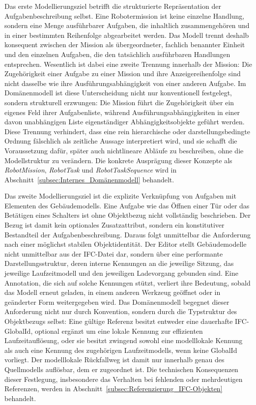 Das erste Modellierungsziel betrifft die strukturierte Repräsentation der Aufgabenbeschreibung
selbst. Eine Robotermission ist keine einzelne Handlung, sondern eine Menge ausführbarer Aufgaben,
die inhaltlich zusammengehören und in einer bestimmten Reihenfolge abgearbeitet werden. Das Modell
trennt deshalb konsequent zwischen der Mission als übergeordneter, fachlich benannter Einheit und
den einzelnen Aufgaben, die den tatsächlich ausführbaren Handlungen entsprechen. Wesentlich ist
dabei eine zweite Trennung innerhalb der Mission: Die Zugehörigkeit einer Aufgabe zu einer Mission
und ihre Anzeigereihenfolge sind nicht dasselbe wie ihre Ausführungsabhängigkeit von einer anderen
Aufgabe. Im Domänenmodell ist diese Unterscheidung nicht nur konventionell festgelegt, sondern
strukturell erzwungen: Die Mission führt die Zugehörigkeit über ein eigenes Feld ihrer
Aufgabenliste, während Ausführungsabhängigkeiten in einer davon unabhängigen Liste eigenständiger
Abhängigkeitsobjekte geführt werden. Diese Trennung verhindert, dass eine rein hierarchische oder
darstellungsbedingte Ordnung fälschlich als zeitliche Aussage interpretiert wird, und sie schafft
die Voraussetzung dafür, später auch nichtlineare Abläufe zu beschreiben, ohne die Modellstruktur zu
verändern. Die konkrete Ausprägung dieser Konzepte als \textit{RobotMission}, \textit{RobotTask}
und \textit{RobotTaskSequence} wird in Abschnitt~\ref{subsec:Internes_Domänenmodell} behandelt.

Das zweite Modellierungsziel ist die explizite Verknüpfung von Aufgaben mit Elementen des
Gebäudemodells. Eine Aufgabe wie das Öffnen einer Tür oder das Betätigen eines Schalters ist ohne
Objektbezug nicht vollständig beschrieben. Der Bezug ist damit kein optionales Zusatzattribut, sondern ein
konstitutiver Bestandteil der Aufgabenbeschreibung. Daraus folgt unmittelbar die Anforderung nach
einer möglichst stabilen Objektidentität. Der Editor stellt Gebäudemodelle nicht unmittelbar aus der
IFC-Datei dar, sondern über eine performante Darstellungsstruktur, deren interne Kennungen an die
jeweilige Sitzung, das jeweilige Laufzeitmodell und den jeweiligen Ladevorgang gebunden sind. Eine
Annotation, die sich auf solche Kennungen stützt, verliert ihre Bedeutung, sobald das Modell erneut
geladen, in einem anderen Werkzeug geöffnet oder in geänderter Form weitergegeben wird. Das
Domänenmodell begegnet dieser Anforderung nicht nur durch Konvention, sondern durch die Typstruktur
des Objektbezugs selbst: Eine gültige Referenz besitzt entweder eine dauerhafte IFC-GlobalId,
optional ergänzt um eine lokale Kennung zur effizienten Laufzeitauflösung, oder sie besitzt zwingend
sowohl eine modelllokale Kennung als auch eine Kennung des zugehörigen Laufzeitmodells, wenn keine
GlobalId vorliegt. Der modelllokale Rückfallweg ist damit nur innerhalb genau des Quellmodells
auflösbar, dem er zugeordnet ist. Die technischen Konsequenzen dieser Festlegung, insbesondere das
Verhalten bei fehlenden oder mehrdeutigen Referenzen, werden in
Abschnitt~\ref{subsec:Referenzierung_IFC-Objekten} behandelt.

